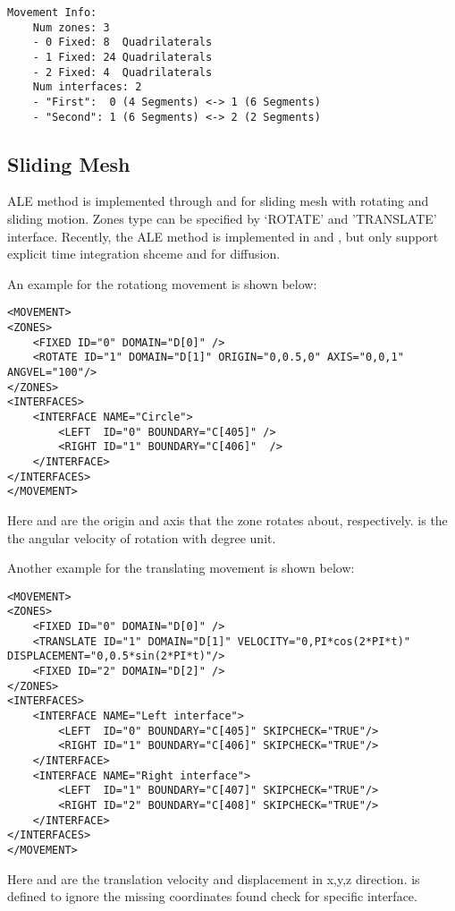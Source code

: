\begin{lstlisting}
Movement Info:
	Num zones: 3
	- 0 Fixed: 8  Quadrilaterals
	- 1 Fixed: 24 Quadrilaterals
	- 2 Fixed: 4  Quadrilaterals
	Num interfaces: 2
	- "First":  0 (4 Segments) <-> 1 (6 Segments)
	- "Second": 1 (6 Segments) <-> 2 (2 Segments)
\end{lstlisting}


\subsection{Sliding Mesh}\label{subsec:Sliding Mesh}
ALE method is implemented through  and  for sliding 
mesh with rotating and sliding motion. Zones type can be specified by `ROTATE' and 
'TRANSLATE' interface. Recently, the ALE method is implemented in  
and , but only support explicit time integration shceme 
and  for diffusion.

An example for the rotationg movement is shown below:

\begin{lstlisting}[style=XMLStyle]
<MOVEMENT>
<ZONES>
    <FIXED ID="0" DOMAIN="D[0]" />
    <ROTATE ID="1" DOMAIN="D[1]" ORIGIN="0,0.5,0" AXIS="0,0,1" ANGVEL="100"/>
</ZONES>
<INTERFACES>
    <INTERFACE NAME="Circle">
        <LEFT  ID="0" BOUNDARY="C[405]" />
        <RIGHT ID="1" BOUNDARY="C[406]"  />
    </INTERFACE>
</INTERFACES>
</MOVEMENT>
\end{lstlisting}

Here  and  are the origin and axis that the zone rotates about, 
respectively.  is the the angular velocity of rotation with degree unit. 

Another example for the translating movement is shown below:

\begin{lstlisting}[style=XMLStyle]
<MOVEMENT>
<ZONES>
    <FIXED ID="0" DOMAIN="D[0]" />
    <TRANSLATE ID="1" DOMAIN="D[1]" VELOCITY="0,PI*cos(2*PI*t)" DISPLACEMENT="0,0.5*sin(2*PI*t)"/>
    <FIXED ID="2" DOMAIN="D[2]" />
</ZONES>
<INTERFACES>
    <INTERFACE NAME="Left interface">
        <LEFT  ID="0" BOUNDARY="C[405]" SKIPCHECK="TRUE"/>
        <RIGHT ID="1" BOUNDARY="C[406]" SKIPCHECK="TRUE"/>
    </INTERFACE>
    <INTERFACE NAME="Right interface">
        <LEFT  ID="1" BOUNDARY="C[407]" SKIPCHECK="TRUE"/>
        <RIGHT ID="2" BOUNDARY="C[408]" SKIPCHECK="TRUE"/>
    </INTERFACE>
</INTERFACES>
</MOVEMENT>
\end{lstlisting}

Here  and  are the translation velocity and 
displacement in x,y,z direction.  is defined to ignore the missing 
coordinates found check for specific interface.